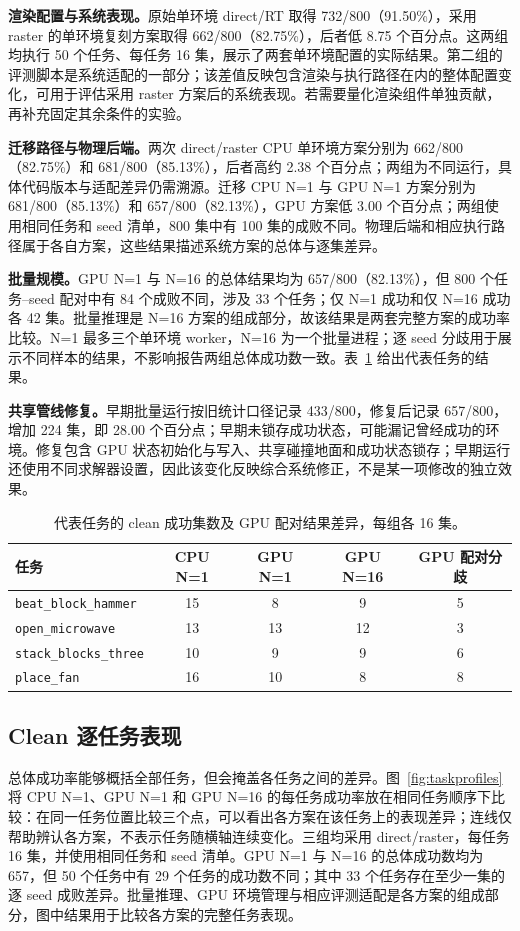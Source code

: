 \documentclass{article}
\begin{document}
\textbf{渲染配置与系统表现。}原始单环境 direct/RT 取得 732/800（91.50\%），采用 raster 的单环境复刻方案取得 662/800（82.75\%），后者低 8.75 个百分点。这两组均执行 50 个任务、每任务 16 集，展示了两套单环境配置的实际结果。第二组的评测脚本是系统适配的一部分；该差值反映包含渲染与执行路径在内的整体配置变化，可用于评估采用 raster 方案后的系统表现。若需要量化渲染组件单独贡献，再补充固定其余条件的实验。

\textbf{迁移路径与物理后端。}两次 direct/raster CPU 单环境方案分别为 662/800（82.75\%）和 681/800（85.13\%），后者高约 2.38 个百分点；两组为不同运行，具体代码版本与适配差异仍需溯源。迁移 CPU N=1 与 GPU N=1 方案分别为 681/800（85.13\%）和 657/800（82.13\%），GPU 方案低 3.00 个百分点；两组使用相同任务和 seed 清单，800 集中有 100 集的成败不同。物理后端和相应执行路径属于各自方案，这些结果描述系统方案的总体与逐集差异。

\textbf{批量规模。}GPU N=1 与 N=16 的总体结果均为 657/800（82.13\%），但 800 个任务--seed 配对中有 84 个成败不同，涉及 33 个任务；仅 N=1 成功和仅 N=16 成功各 42 集。批量推理是 N=16 方案的组成部分，故该结果是两套完整方案的成功率比较。N=1 最多三个单环境 worker，N=16 为一个批量进程；逐 seed 分歧用于展示不同样本的结果，不影响报告两组总体成功数一致。表~\ref{tab:tasks} 给出代表任务的结果。

\textbf{共享管线修复。}早期批量运行按旧统计口径记录 433/800，修复后记录 657/800，增加 224 集，即 28.00 个百分点；早期未锁存成功状态，可能漏记曾经成功的环境。修复包含 GPU 状态初始化与写入、共享碰撞地面和成功状态锁存；早期运行还使用不同求解器设置，因此该变化反映综合系统修正，不是某一项修改的独立效果。

\begin{table}[htbp]
\centering\small
\caption{代表任务的 clean 成功集数及 GPU 配对结果差异，每组各 16 集。}
\label{tab:tasks}
\begin{tabular}{@{}lcccc@{}}
\toprule
任务 & CPU N=1 & GPU N=1 & GPU N=16 & GPU 配对分歧 \\
\midrule
\texttt{beat\_block\_hammer} & 15 & 8 & 9 & 5 \\
\texttt{open\_microwave} & 13 & 13 & 12 & 3 \\
\texttt{stack\_blocks\_three} & 10 & 9 & 9 & 6 \\
\texttt{place\_fan} & 16 & 10 & 8 & 8 \\
\bottomrule
\end{tabular}
\end{table}

\subsection{Clean 逐任务表现}
总体成功率能够概括全部任务，但会掩盖各任务之间的差异。图~\ref{fig:taskprofiles} 将 CPU N=1、GPU N=1 和 GPU N=16 的每任务成功率放在相同任务顺序下比较：在同一任务位置比较三个点，可以看出各方案在该任务上的表现差异；连线仅帮助辨认各方案，不表示任务随横轴连续变化。三组均采用 direct/raster，每任务 16 集，并使用相同任务和 seed 清单。GPU N=1 与 N=16 的总体成功数均为 657，但 50 个任务中有 29 个任务的成功数不同；其中 33 个任务存在至少一集的逐 seed 成败差异。批量推理、GPU 环境管理与相应评测适配是各方案的组成部分，图中结果用于比较各方案的完整任务表现。
\end{document}
